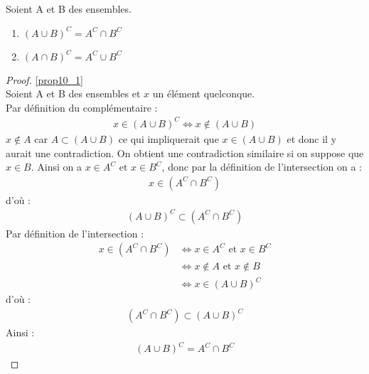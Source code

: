 \begin{propositionbox}
    \begin{proposition} Soient A et B des ensembles.
	\begin{enumerate}
		\item \label{prop10_1} $(A \cup B)^C = A^C \cap B^C$
		\item \label{prop10_2} $(A \cap B)^C = A^C \cup B^C$
	\end{enumerate}
\end{proposition}
\end{propositionbox}
\begin{proof}
	\ref{prop10_1} \\
	Soient A et B des ensembles et $x$ un élément quelconque.
	\\
	\framebox{$\subset$}
	Par définition du complémentaire : 
	\begin{align*}
		x \in (A \cup B)^C \iff x \notin (A \cup B)
	\end{align*}
	$x \notin A$ car $A \subset (A \cup B)$ ce qui impliquerait que $x \in (A \cup B)$ et donc il y aurait une contradiction. On obtient une contradiction similaire si on suppose que $x \in B$. Ainsi on a $x \in A^C \text{ et } x \in B^C$, donc par la définition de l'intersection on a :
	\begin{align*}
		x \in (A^C \cap B^C)
	\end{align*}
	d'où :
	\begin{align*}
		(A \cup B)^C \subset (A^C \cap B^C)
	\end{align*}
	\framebox{$\supset$} Par définition de l'intersection :
	\begin{align*}
		x \in (A^C \cap B^C) &\iff x \in A^C \text{ et } x \in B^C \\
		&\iff x \notin A \text{ et } x \notin B \\
		&\iff x \in (A \cup B)^C
	\end{align*}
	d'où :
	\begin{align*}
		(A^C \cap B^C) \subset (A \cup B)^C
	\end{align*}
	Ainsi : 
	\begin{align*}
		(A \cup B)^C = A^C \cap B^C
	\end{align*}
\end{proof}

